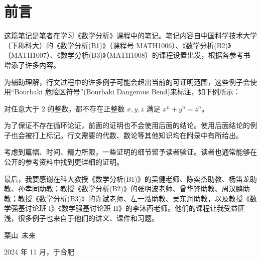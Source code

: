 \chapter*{前言}

这篇笔记是笔者在学习《数学分析》课程中的笔记。笔记内容自中国科学技术大学（下称科大）的《数学分析(B1)》（课程号 MATH1006）、《数学分析(B2)》（MATH1007）、《数学分析(B3)》（MATH1008）的课程设置出发，根据各参考书增添了许多内容。
  
为辅助理解，行文过程中的许多例子可能会超出当前的可证明范围，这些例子会使用“Bourbaki\footnotemark{} 危险区符号”(Bourbaki Dangerous Bend)\footnotemark{}来标注，如下例所示：



\begin{dtheorem*}
  对任意大于 \(2\) 的整数，都不存在正整数 \(x,y,z\) 满足 \(x^n+y^n=z^n\)。
\end{dtheorem*}


为了保证不存在循环论证，前面的证明也不会使用后面的结论。使用后面结论的例子也会被打上标记。行文需要的代数、数论等其他知识均在附录中有所给出。


考虑到篇幅、时间、精力所限，一些证明的细节留予读者验证。读者也通常能够在公开的参考资料中找到更详细的证明。

最后，我要感谢在科大教授《数学分析(B1)》的吴健老师、陈奕杰助教、杨笛龙助教、孙孝同助教；教授《数学分析(B2)》的张明波老师、曾华锋助教、周汉鹏助教；教授《数学分析(B3)》的许斌老师、左一泓助教、吴东润助教，以及教授《数学强基讨论班 I》《数学强基讨论班 II》的李沐西老师。\footnotemark{}他们的课程让我受益匪浅，很多例子也来自于他们的讲义、课件和习题。


\begin{flushright}
  栗山~未来\footnotemark

  2024 年 11 月，于合肥
\end{flushright}
